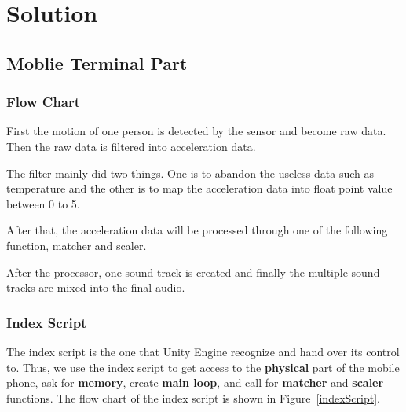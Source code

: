 \section{Solution}

\subsection{Moblie Terminal Part}

\subsubsection{Flow Chart}

\hspace*{2em}First the motion of one person is detected by the sensor and become
raw data. 
   Then the raw data is filtered into acceleration data. 

   The filter mainly did two things.
   One is to abandon the useless data such as temperature and the other is to
   map the acceleration data into float point value between 0 to 5. 

   After that, the acceleration data will be processed through one of the
   following function, matcher and scaler. 

   After the processor, one sound track is created and finally the multiple
   sound tracks are mixed into the final audio. 

\subsubsection{Index Script}

The index script is the one that Unity Engine recognize and hand over its
control to. 
Thus, we use the index script to get access to the \textbf{physical} part of the
mobile phone, ask for \textbf{memory}, create \textbf{main loop}, and call for
\textbf{matcher} and \textbf{scaler} functions.
The flow chart of the index script is shown in Figure~\ref{indexScript}.

